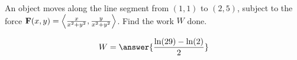 \documentclass{ximera}
\author{David Guichard \and Neal Koblitz \and H. Jerome Keisler \and Albert Scheller \and Barry Balof \and Mike Wills \and Matthew Carr}
\begin{document}
\begin{exercise}




An object moves along the line segment from $(1,1)$ to $(2,5)$, subject to the force $\mathbf{F}(x,y)=\left\langle \frac{x}{x^2+y^2},\frac{y}{x^2+y^2}\right\rangle$. Find the work $W$ done.
\begin{prompt}
\[
W=\answer{\frac{\ln(29)-\ln(2)}{2}}
\]
\end{prompt}



\end{exercise}
\end{document}
